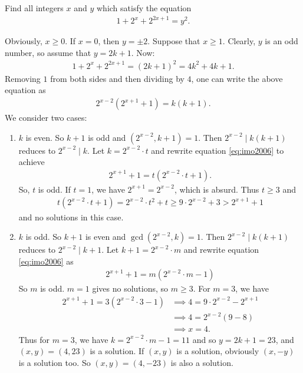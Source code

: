 \documentclass[problems.tex]{subfile}
\begin{document}
	\begin{problem}[IMO 2006]
		Find all integers $x$ and $y$ which satisfy the equation
		\begin{align*}
		1 + 2^x + 2^{2x + 1} = y^2.
		\end{align*}
	\end{problem}

	\begin{solution}
		Obviously, $x \ge 0$. If $x = 0$, then $y = \pm 2$. Suppose that $x \ge 1$. Clearly, $y$ is an odd number, so assume that $y = 2k + 1$. Now:
		\begin{align*}
		1 + 2^x + 2^{2x + 1} = (2k + 1)^2 = 4k^2 + 4k + 1.
		\end{align*}
		Removing $1$ from both sides and then dividing by $4$, one can write the above equation as
		\begin{align}\label{eq:imo2006}
		2^{x - 2}(2^{x + 1} + 1) = k(k + 1).
		\end{align}
		We consider two cases:
		\begin{enumerate}
			\item $k$ is even. So $k + 1$ is odd and $(2^{x - 2}, k + 1) = 1$. Then $2^{x - 2}\mid k(k + 1)$ reduces to $2^{x - 2}\mid k$. Let $k = 2^{x - 2} \cdot t$ and rewrite equation \eqref{eq:imo2006} to achieve
			\begin{align*}
			2^{x + 1} + 1 = t(2^{x - 2} \cdot t + 1).
			\end{align*}
			So, $t$ is odd. If $t = 1$, we have $2^{x + 1} = 2^{x - 2}$, which is absurd. Thus $t \ge 3$ and
			\begin{align*}
			t(2^{x - 2} \cdot t + 1) = 2^{x - 2} \cdot t^2 + t \ge 9 \cdot 2^{x - 2} + 3 > 2^{x + 1} + 1
			\end{align*}
			and no solutions in this case.

			\item $k$ is odd. So $k + 1$ is even and $\gcd(2^{x - 2}, k) = 1$. Then $2^{x - 2}\mid k(k + 1)$ reduces to $2^{x - 2}\mid k+1$. Let $k+1 = 2^{x - 2} \cdot m$ and rewrite equation \eqref{eq:imo2006} as
			\begin{align*}
			2^{x + 1} + 1 = m(2^{x - 2} \cdot m - 1)
			\end{align*}
			So $m$ is odd. $m = 1$ gives no solutions, so $m \ge 3$. For $m = 3$, we have
			\begin{align*}
			2^{x + 1} + 1 = 3(2^{x - 2} \cdot 3 - 1) &\implies 4 = 9 \cdot 2^{x - 2} - 2^{x + 1} \\
			&\implies 4 = 2^{x - 2}(9 - 8) \\
			&\implies x = 4.
			\end{align*}
			Thus for $m = 3$, we have $k = 2^{x - 2} \cdot m - 1 = 11$ and so $y = 2k + 1 = 23$, and $(x, y) = (4, 23)$ is a solution. If $(x, y)$ is a solution, obviously $(x, -y)$ is a solution too. So $(x, y) = (4, -23)$ is also a solution.


\end{enumerate}
\end{solution}
\end{document}
